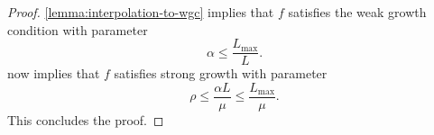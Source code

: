\interpToSGC*
\begin{proof}
    \autoref{lemma:interpolation-to-wgc} implies that \( f \) satisfies the weak growth condition with parameter
    \[ \alpha \leq \frac{L_{\text{max}}}{L}. \]
    \citet[Proposition 1]{vaswani2019fast} now implies that \( f \) satisfies strong growth with parameter
    \[ \rho \leq \frac{\alpha L}{\mu} \leq \frac{L_{\text{max}}}{\mu}.  \]
    This concludes the proof.
\end{proof}

